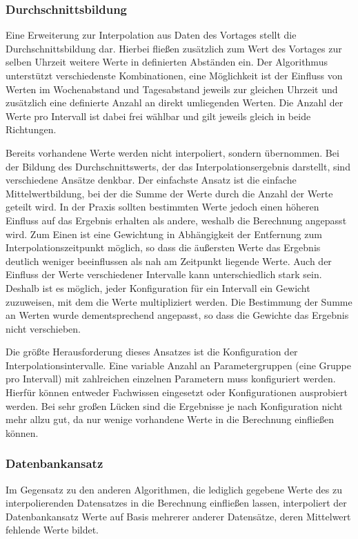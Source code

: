 
\subsubsection{Durchschnittsbildung}
Eine Erweiterung zur Interpolation aus Daten des Vortages stellt die Durchschnittsbildung dar. Hierbei fließen zusätzlich zum Wert des Vortages zur selben Uhrzeit weitere Werte in definierten Abständen ein. Der Algorithmus unterstützt verschiedenste Kombinationen, eine Möglichkeit ist der Einfluss von Werten im Wochenabstand und Tagesabstand jeweils zur gleichen Uhrzeit und zusätzlich eine definierte Anzahl an direkt umliegenden Werten. Die Anzahl der Werte pro Intervall ist dabei frei wählbar und gilt jeweils gleich in beide Richtungen.

Bereits vorhandene Werte werden nicht interpoliert, sondern übernommen. Bei der Bildung des Durchschnittswerts, der das Interpolationsergebnis darstellt, sind verschiedene Ansätze denkbar. Der einfachste Ansatz ist die einfache Mittelwertbildung, bei der die Summe der Werte durch die Anzahl der Werte geteilt wird. In der Praxis sollten bestimmten Werte jedoch einen höheren Einfluss auf das Ergebnis erhalten als andere, weshalb die Berechnung angepasst wird.
Zum Einen ist eine Gewichtung in Abhängigkeit der Entfernung zum Interpolationszeitpunkt möglich, so dass die äußersten Werte das Ergebnis deutlich weniger beeinflussen als nah am Zeitpunkt liegende Werte.
Auch der Einfluss der Werte verschiedener Intervalle kann unterschiedlich stark sein. Deshalb ist es möglich, jeder Konfiguration für ein Intervall ein Gewicht zuzuweisen, mit dem die Werte multipliziert werden. Die Bestimmung der Summe an Werten wurde dementsprechend angepasst, so dass die Gewichte das Ergebnis nicht verschieben.

Die größte Herausforderung dieses Ansatzes ist die Konfiguration der Interpolationsintervalle. Eine variable Anzahl an Parametergruppen (eine Gruppe pro Intervall) mit zahlreichen einzelnen Parametern muss konfiguriert werden. Hierfür können entweder Fachwissen eingesetzt oder Konfigurationen ausprobiert werden.
Bei sehr großen Lücken sind die Ergebnisse je nach Konfiguration nicht mehr allzu gut, da nur wenige vorhandene Werte in die Berechnung einfließen können.

\subsubsection{Datenbankansatz}
Im Gegensatz zu den anderen Algorithmen, die lediglich gegebene Werte des zu interpolierenden Datensatzes in die Berechnung einfließen lassen, interpoliert der Datenbankansatz Werte auf Basis mehrerer anderer Datensätze, deren Mittelwert fehlende Werte bildet.

